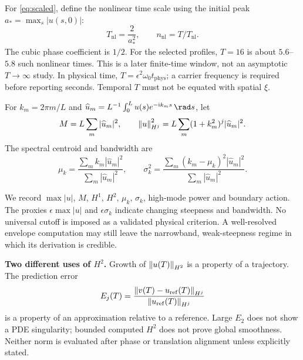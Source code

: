 For \eqref{eq:scaled}, define the nonlinear time scale using the initial peak $a_*=\max_s|u(s,0)|$:
\begin{equation}
 T_{\mathrm{nl}}=\frac{2}{a_*^2},\qquad
 n_{\mathrm{nl}}=T/T_{\mathrm{nl}}.
\end{equation}
The cubic phase coefficient is $1/2$. For the selected profiles, $T=16$ is about $5.6$--$5.8$ such nonlinear times. This is a later finite-time window, not an asymptotic $T\to\infty$ study. In physical time, $T=\epsilon^2\omega_0t_{\mathrm{phys}}$; a carrier frequency is required before reporting seconds. Temporal $T$ must not be equated with spatial $\xi$.

\begin{definition}
For $k_m=2\pi m/L$ and $\widehat u_m=L^{-1}\int_0^L u(s)e^{-\ii k_ms}\,\rad s$, let
\[
 M=L\sum_m|\widehat u_m|^2,\qquad
 \left\lVert u\right\rVert_{H^j}^2=L\sum_m(1+k_m^2)^j|\widehat u_m|^2.
\]
The spectral centroid and bandwidth are
\[\mu_k=\frac{\sum_m k_m|\widehat u_m|^2}{\sum_m|\widehat u_m|^2},\qquad\sigma_k^2=\frac{\sum_m(k_m-\mu_k)^2|\widehat u_m|^2}{\sum_m|\widehat u_m|^2}.\]
\end{definition}
We record $\max|u|$, $M$, $H^1$, $H^2$, $\mu_k$, $\sigma_k$, high-mode power and boundary action. The proxies $\epsilon\max|u|$ and $\epsilon\sigma_k$ indicate changing steepness and bandwidth. No universal cutoff is imposed as a validated physical criterion. A well-resolved envelope computation may still leave the narrowband, weak-steepness regime in which its derivation is credible.

\textbf{Two different uses of $H^2$.} Growth of $\left\lVert u(T)\right\rVert_{H^2}$ is a property of a trajectory. The prediction error
\begin{equation}
 E_j(T)=\frac{\left\lVert v(T)-u_{\rm ref}(T)\right\rVert_{H^j}}{\left\lVert u_{\rm ref}(T)\right\rVert_{H^j}}
 \label{eq:error}
\end{equation}
is a property of an approximation relative to a reference. Large $E_2$ does not show a PDE singularity; bounded computed $H^2$ does not prove global smoothness. Neither norm is evaluated after phase or translation alignment unless explicitly stated.
